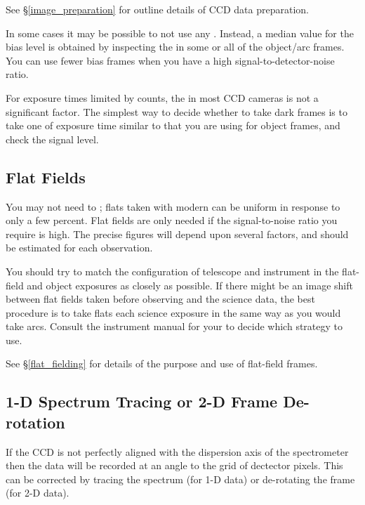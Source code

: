 \documentclass[twoside,11pt]{starlink}
\providecommand{\mlabel}[1]{\xlabel{#1}\label{#1}}
\providecommand{\scspec}[2]{#1}
\begin{document}
See \scspec{\S\ref{image_preparation}}
{\htmlref{{\sl Image Preparation}}{image_preparation}}
for outline details of CCD data preparation.

In some cases it may be possible to not use any
.  Instead,
a median value for the bias level is obtained by inspecting the
 in some or all of the
object/arc frames.
You can use fewer bias frames when you have a high
signal-to-detector-noise ratio.

For exposure times limited by 
counts, the  in most CCD cameras
is not a significant factor.
The simplest way to decide whether to take dark frames is to take one
of exposure time similar to that you are using for object frames, and
check the signal level.


\subsection{\mlabel{flat_intro}Flat Fields}

You may not need to ;
flats taken with modern  can be
uniform in response to only a few percent.
Flat fields are only needed if the signal-to-noise ratio
you require is high.
The precise figures will depend upon several factors,
and should be estimated for each observation.

You should try to match the configuration of telescope and instrument
in the flat-field and object exposures as closely as possible.
If there might be an image shift between flat fields taken before
observing and the science data, the best procedure is to take flats
 each science exposure in the same
way as you would take arcs.  Consult the instrument manual for your
 to decide which strategy
to use.

See \scspec{\S\ref{flat_fielding}}
{\htmlref{Flat Fielding}{flat_fielding}} for details of
the purpose and use of flat-field frames.


\subsection{1-D Spectrum Tracing or 2-D Frame De-rotation}

If the CCD is not perfectly aligned with the dispersion axis of the
spectrometer then the data will be recorded at an angle to the grid of
dectector pixels. This can be corrected by tracing the spectrum (for
1-D data) or de-rotating the frame (for 2-D data).
\end{document}
